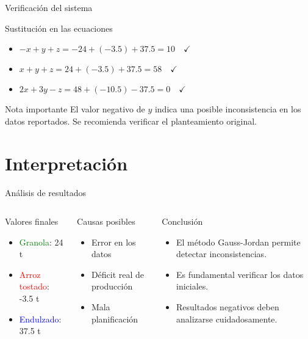 \documentclass{beamer}
\begin{document}
\begin{frame}{Verificación del sistema}
\begin{block}{Sustitución en las ecuaciones}
\begin{itemize}
\item $-x + y + z = -24 + (-3.5) + 37.5 = 10 \quad \checkmark$
\item $x + y + z = 24 + (-3.5) + 37.5 = 58 \quad \checkmark$
\item $2x + 3y - z = 48 + (-10.5) - 37.5 = 0 \quad \checkmark$
\end{itemize}
\end{block}

\begin{alertblock}{Nota importante}
El valor negativo de $y$ indica una posible inconsistencia en los datos reportados. Se recomienda verificar el planteamiento original.
\end{alertblock}
\end{frame}

\section{Interpretación}
\begin{frame}{Análisis de resultados}
\begin{columns}[T]
\begin{block}{Valores finales}
\begin{itemize}
\item \textcolor{green}{Granola}: 24 t
\item \textcolor{red}{Arroz tostado}: -3.5 t
\item \textcolor{blue}{Endulzado}: 37.5 t
\end{itemize}
\end{block}

\begin{block}{Causas posibles}
\begin{itemize}
\item Error en los datos
\item Déficit real de producción
\item Mala planificación
\end{itemize}
\end{block}

\begin{alertblock}{Conclusión}
\begin{itemize}
\item El método Gauss-Jordan permite detectar inconsistencias.
\item Es fundamental verificar los datos iniciales.
\item Resultados negativos deben analizarse cuidadosamente.
\end{itemize}
\end{alertblock}

\end{columns}
\end{frame}
\end{document}
